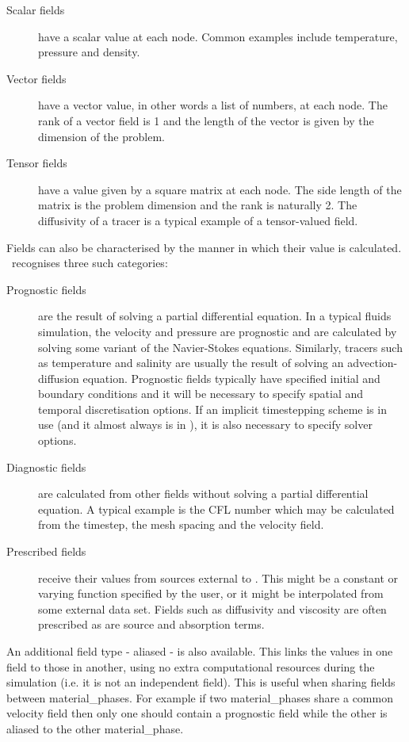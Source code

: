 \begin{description}
\item[Scalar fields] have a scalar value at each node. Common examples
  include temperature, pressure and density.
\item[Vector fields] have a vector value, in other words a list of numbers,
  at each node. The rank of a vector field is 1 and the length of the
  vector is given by the dimension of the problem.
\item[Tensor fields] have a value given by a square matrix at each
  node. The side length of the matrix is the problem dimension and the rank
  is naturally 2. The diffusivity of a tracer is a typical example of a
  tensor-valued field.
\end{description}

Fields can also be characterised by the manner in which their value is
calculated. \fluidity\ recognises three such categories:

\begin{description}
\item[Prognostic fields] are the result of solving a partial differential
  equation. In a typical fluids simulation, the velocity and pressure are
  prognostic and are calculated by solving some variant of the Navier-Stokes
  equations. Similarly, tracers such as temperature and salinity are usually
  the result of solving an advection-diffusion equation. Prognostic fields
  typically have specified initial and boundary conditions and it will be
  necessary to specify spatial and temporal discretisation options. If an
  implicit timestepping scheme is in use (and it almost always is in
  \fluidity), it is also necessary to specify solver options. 
\item[Diagnostic fields] are calculated from other fields without solving a
  partial differential equation. A typical example is the CFL number which
  may be calculated from the timestep, the mesh spacing and the velocity
  field. 
\item[Prescribed fields] receive their values from sources external to
  \fluidity. This might be a constant or varying function specified by the
  user, or it might be interpolated from some external data set. Fields such
  as diffusivity and viscosity are often prescribed as are source and
  absorption terms.
\end{description}

An additional field type - aliased - is also available.  This links the values in one field to those in another, using no extra computational resources during the simulation (i.e. it is not an independent field).  This is useful when sharing fields between material\_phases.  For example if two material\_phases share a common velocity field then only one should contain a prognostic field while the other is aliased to the other material\_phase.

